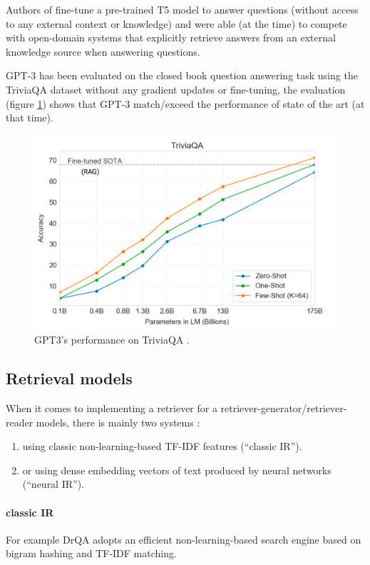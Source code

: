 \documentclass[a4paper,12pt]{article}
\begin{document}
Authors of \cite{T5Qa} fine-tune a pre-trained T5 \cite{T5} model to answer questions
(without access to any external context or knowledge) and were able (at the time) to compete with open-domain systems that
explicitly retrieve answers from an external knowledge source when answering questions.

GPT-3 \cite{gpt3} has been evaluated on the closed book question answering task using the TriviaQA dataset \cite{triviaqa} without any gradient updates or fine-tuning, the evaluation (figure \ref{fig:gpt3}) shows that GPT-3 match/exceed the performance of state of the art (at that time).

\begin{figure}
\centering
\includegraphics[width=0.8\linewidth]{figures/gpt3-triviaqa.png}
\caption{GPT3's performance on TriviaQA \cite{triviaqa}. \cite{gpt3}}
\label{fig:gpt3}
\end{figure}

\subsection{Retrieval models}
When it comes to implementing a retriever for a retriever-generator/retriever-reader models, there is mainly two systems : 
\begin{enumerate}
    \item using classic non-learning-based TF-IDF features (“classic IR”).
    \item or using dense embedding vectors of text produced by neural networks (“neural IR”).
\end{enumerate}

\paragraph{classic IR}
For example DrQA \cite{drqa} adopts an efficient non-learning-based search engine based on bigram hashing
and TF-IDF matching.
\end{document}
